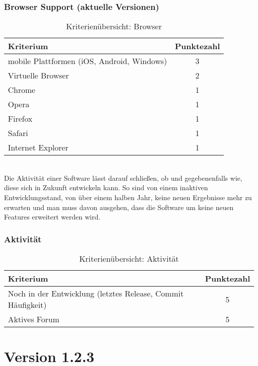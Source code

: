 \subsubsection{Browser Support (aktuelle Versionen)} 
\begin{table}[H]
 	\vspace{-30pt}
 	\centering
		\begin{tabular}{| p{12cm} | c|}
			\hline
				Kriterium		 &	Punktezahl\\
			\hline
			\hline
				mobile Plattformen (iOS, Android, Windows)			&3\\
				Virtuelle Browser	&	2	\\
				Chrome				&	1	\\
				Opera				&	1	\\
				Firefox				&	1	\\
				Safari				&	1	\\
				Internet Explorer		&	1	\\
				\hline
		\end{tabular}
	\caption{Kriterienübersicht: Browser}
\end{table}

\\Die Aktivität einer Software lässt darauf schließen, ob und gegebenenfalls wie, diese sich in Zukunft entwickeln kann. So sind von einem inaktiven Entwicklungsstand, von über einem halben Jahr, keine neuen Ergebnisse mehr zu erwarten und man muss davon ausgehen, dass die Software um keine neuen Features erweitert werden wird.
\subsubsection{Aktivität}
\begin{table}[H]
 	\vspace{-30pt}
 	\centering
		\begin{tabular}{| p{12cm} | c|}
			\hline
				Kriterium		 &	Punktezahl\\
			\hline
			\hline
				Noch in der Entwicklung (letztes Release, Commit Häufigkeit)			&5\\
				Aktives Forum	&	5	\\
				\hline
		\end{tabular}
	\caption{Kriterienübersicht: Aktivität}
\end{table}



	\pagebreak
	\section{ Version 1.2.3}

